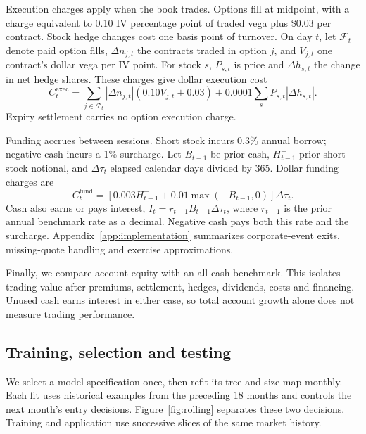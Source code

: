 \documentclass[11pt,letterpaper]{article}
\newcommand{\money}[1]{\$#1}
\begin{document}
Execution charges apply when the book trades. Options fill at midpoint, with
a charge equivalent to 0.10 IV percentage point of traded vega plus
\money{0.03} per contract. Stock hedge changes cost one basis point of turnover.
On day $t$, let $\mathcal F_t$ denote paid option fills, $\Delta n_{j,t}$ the
contracts traded in option $j$, and $V_{j,t}$ one contract's dollar vega per
IV point. For stock $s$, $P_{s,t}$ is price and $\Delta h_{s,t}$ the change in
net hedge shares. These charges give dollar execution cost
\[
C_t^{\mathrm{exec}}=\sum_{j\in\mathcal F_t}|\Delta n_{j,t}|
 (0.10V_{j,t}+0.03)+0.0001\sum_s P_{s,t}|\Delta h_{s,t}|.
\]
Expiry settlement carries no option execution charge.

Funding accrues between sessions. Short stock incurs 0.3\% annual borrow;
negative cash incurs a 1\% surcharge. Let $B_{t-1}$ be prior cash,
$H^-_{t-1}$ prior short-stock notional, and $\Delta\tau_t$ elapsed calendar
days divided by 365. Dollar funding charges are
\[
C_t^{\mathrm{fund}}=
 [0.003H^-_{t-1}+0.01\max(-B_{t-1},0)]\Delta\tau_t.
\]
Cash also earns or pays interest, $I_t=r_{t-1}B_{t-1}\Delta\tau_t$, where
$r_{t-1}$ is the prior annual benchmark rate as a decimal. Negative cash pays
both this rate and the surcharge. Appendix~\ref{app:implementation} summarizes
corporate-event exits, missing-quote handling and exercise approximations.

Finally, we compare account equity with an all-cash benchmark. This isolates
trading value after premiums, settlement, hedges, dividends, costs and financing.
Unused cash earns interest in either case, so total account growth alone does
not measure trading performance.

\clearpage
\subsection{Training, selection and testing}
We select a model specification once, then refit its tree and size map monthly.
Each fit uses historical examples from the preceding 18 months and controls
the next month's entry decisions. Figure~\ref{fig:rolling} separates these two
decisions. Training and application use successive slices of the same market history.
\end{document}
